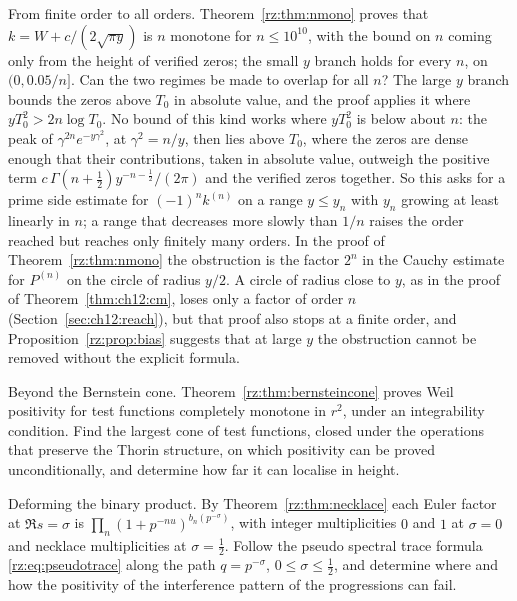 \begin{problem}\label{rz:prob:allorders}
From finite order to all orders. Theorem~\ref{rz:thm:nmono} proves that $k=W+c/(2\sqrt{\pi y})$ is $n$ monotone for $n\le10^{10}$, with the bound on $n$ coming only from the height of verified zeros; the small $y$ branch holds for every $n$, on $(0,0.05/n]$. Can the two regimes be made to overlap for all $n$? The large $y$ branch bounds the zeros above $T_0$ in absolute value, and the proof applies it where $yT_0^2>2n\log T_0$. No bound of this kind works where $yT_0^2$ is below about $n$: the peak of $\gamma^{2n}e^{-y\gamma^2}$, at $\gamma^2=n/y$, then lies above $T_0$, where the zeros are dense enough that their contributions, taken in absolute value, outweigh the positive term $c\,\Gamma(n+\frac12)y^{-n-\frac12}/(2\pi)$ and the verified zeros together. So this asks for a prime side estimate for $(-1)^nk^{(n)}$ on a range $y\le y_n$ with $y_n$ growing at least linearly in $n$; a range that decreases more slowly than $1/n$ raises the order reached but reaches only finitely many orders. In the proof of Theorem~\ref{rz:thm:nmono} the obstruction is the factor $2^n$ in the Cauchy estimate for $P^{(n)}$ on the circle of radius $y/2$. A circle of radius close to $y$, as in the proof of Theorem~\ref{thm:ch12:cm}, loses only a factor of order $n$ (Section~\ref{sec:ch12:reach}), but that proof also stops at a finite order, and Proposition~\ref{rz:prop:bias} suggests that at large $y$ the obstruction cannot be removed without the explicit formula.
\end{problem}

\begin{problem}\label{rz:prob:cone}
Beyond the Bernstein cone. Theorem~\ref{rz:thm:bernsteincone} proves Weil positivity for test functions completely monotone in $r^2$, under an integrability condition. Find the largest cone of test functions, closed under the operations that preserve the Thorin structure, on which positivity can be proved unconditionally, and determine how far it can localise in height.
\end{problem}

\begin{problem}\label{rz:prob:binary}
Deforming the binary product. By Theorem~\ref{rz:thm:necklace} each Euler factor at $\Re s=\sigma$ is $\prod_n(1+p^{-nu})^{b_n(p^{-\sigma})}$, with integer multiplicities $0$ and $1$ at $\sigma=0$ and necklace multiplicities at $\sigma=\frac12$. Follow the pseudo spectral trace formula \eqref{rz:eq:pseudotrace} along the path $q=p^{-\sigma}$, $0\le\sigma\le\frac12$, and determine where and how the positivity of the interference pattern of the progressions can fail.
\end{problem}

